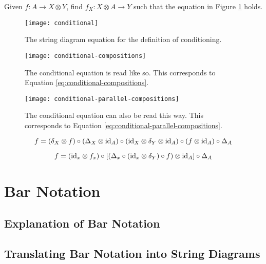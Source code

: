 Given $f:A\rightarrow X\otimes Y$, find $f_X : X\otimes A \rightarrow Y$ such that the equation in Figure \ref{fig:conditional} holds.

\begin{figure}[htb]
	\centering
	\texttt{[image: conditional]}
	\caption{The string diagram equation for the definition of conditioning.}
	\label{fig:conditional}
\end{figure}

\begin{figure}[htb]
	\centering
	\texttt{[image: conditional-compositions]}
	\caption{The conditional equation is read like so. This corresponds to Equation \ref{eq:conditional-compositions}.}
	\label{fig:conditional-compositions}
\end{figure}

\begin{figure}[htb]
	\centering
	\texttt{[image: conditional-parallel-compositions]}
	\caption{The conditional equation can also be read this way. This corresponds to Equation \ref{eq:conditional-parallel-compositions}.}
	\label{fig:conditional-parallel-compositions}
\end{figure}

\begin{equation}
\label{eq:conditional-compositions}
f = (\delta_X \otimes f) \circ (\Delta_X \otimes \mathrm{id}_A)
\circ (\mathrm{id}_X \otimes \delta_Y \otimes \mathrm{id}_A) \circ (f \otimes \mathrm{id}_A) \circ \Delta_A
\end{equation}

\begin{equation}
\label{eq:conditional-parallel-compositions}
f = (\mathrm{id}_x \otimes f_x) \circ \left[\left(\Delta_x \circ (\mathrm{id}_x\otimes \delta_Y) \circ f\right) \otimes \mathrm{id}_A\right] \circ \Delta_A
\end{equation}

\section{Bar Notation}
\subsection{Explanation of Bar Notation}
\subsection{Translating Bar Notation into String Diagrams}

